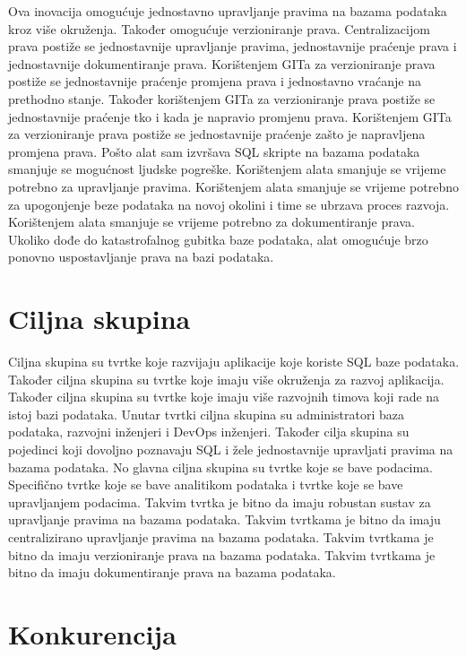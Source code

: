 Ova inovacija omogućuje jednostavno upravljanje pravima na bazama podataka kroz
više okruženja. Također omogućuje verzioniranje prava. Centralizacijom prava
postiže se jednostavnije upravljanje pravima, jednostavnije praćenje prava i
jednostavnije dokumentiranje prava. Korištenjem GITa za verzioniranje prava
postiže se jednostavnije praćenje promjena prava i jednostavno vraćanje na
prethodno stanje. Također korištenjem GITa za verzioniranje prava postiže se
jednostavnije praćenje tko i kada je napravio promjenu prava. Korištenjem GITa
za verzioniranje prava postiže se jednostavnije praćenje zašto je napravljena
promjena prava. Pošto alat sam izvršava SQL skripte na bazama podataka smanjuje
se mogućnost ljudske pogreške. Korištenjem alata smanjuje se vrijeme potrebno za
upravljanje pravima. Korištenjem alata smanjuje se vrijeme potrebno za
upogonjenje beze podataka na novoj okolini i time se ubrzava proces razvoja.
Korištenjem alata smanjuje se vrijeme potrebno za dokumentiranje prava. Ukoliko
dođe do katastrofalnog gubitka baze podataka, alat omogućuje brzo ponovno
uspostavljanje prava na bazi podataka.

\section{Ciljna skupina} \label{ciljna_skupina}

Ciljna skupina su tvrtke koje razvijaju aplikacije koje koriste SQL baze
podataka. Također ciljna skupina su tvrtke koje imaju više okruženja za
razvoj aplikacija. Također ciljna skupina su tvrtke koje imaju više razvojnih
timova koji rade na istoj bazi podataka. Unutar tvrtki ciljna skupina su
administratori baza podataka, razvojni inženjeri i DevOps inženjeri.
Također cilja skupina su pojedinci koji dovoljno poznavaju SQL i žele
jednostavnije upravljati pravima na bazama podataka. No glavna ciljna skupina su
tvrtke koje se bave podacima. Specifično tvrtke koje se bave analitikom podataka
i tvrtke koje se bave upravljanjem podacima. Takvim tvrtka je bitno da imaju
robustan sustav za upravljanje pravima na bazama podataka. Takvim tvrtkama je
bitno da imaju centralizirano upravljanje pravima na bazama podataka. Takvim
tvrtkama je bitno da imaju verzioniranje prava na bazama podataka. Takvim
tvrtkama je bitno da imaju dokumentiranje prava na bazama podataka.

\section{Konkurencija} \label{konkurencija}

